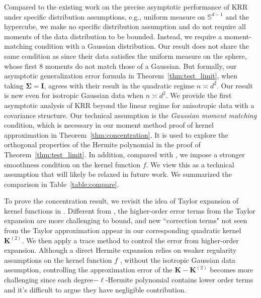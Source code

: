 \documentclass[twoside,11pt]{article}
\def\bI{{\mathbf I}}
\def\bK{{\boldsymbol K}}
\def\bSigma{{\boldsymbol \Sigma}}
\renewcommand{\bK}{\boldsymbol{K}}
\newcommand{\1}{\mathbf{1}}
\begin{document}
Compared to the existing work \citep{mei2019generalization,xiao2022precise,montanari2020interpolation,mei2021generalization} on the precise asymptotic performance of KRR under specific distribution assumptions, e.g., uniform measure on $\mathbb{S}^{d-1}$ and the hypercube, we make no specific distribution assumption and do not require all moments of the data distribution to be bounded. Instead, we require a moment-matching condition with a Gaussian distribution. Our result does not share the same condition as \cite{xiao2022precise} since their data satisfies the uniform measure on the sphere, whose first 8 moments do not match those of a Gaussian. But formally, our asymptotic generalization error formula in Theorem~\ref{thm:test_limit}, when taking $\bSigma=\bI$, agrees with their result in the quadratic regime $n\asymp d^2$.  Our result is new even for isotropic Gaussian data when $n\asymp d^2$. We provide the first asymptotic analysis of KRR beyond the linear regime for anisotropic data with a covariance structure. Our technical assumption is the \textit{Gaussian moment matching} condition, which is necessary in our moment method proof of kernel approximation in Theorem~\ref{thm:concentration}. It is used to explore the orthogonal properties of the Hermite polynomial in the proof of Theorem~\ref{thm:test_limit}. In addition, compared with \cite{xiao2022precise,ghorbani2021linearized,mei2021generalization}, we impose a stronger smoothness condition on the kernel function $f$. We view this as a technical assumption that will likely be relaxed in future work. We summarized the comparison in Table~\ref{table:compare}.



To prove the concentration result,  we revisit the idea of Taylor expansion of kernel functions in \citep{el2010spectrum}. Different from \cite{el2010spectrum}, the higher-order error terms from the Taylor expansion are more challenging to bound, and new ``correction terms" not seen from the Taylor approximation appear in our corresponding quadratic kernel $\bK^{(2)}$. 
We then apply a trace method to control the error from higher-order expansion. 
Although a direct Hermite expansion relies on weaker regularity assumptions on the kernel function $f$ \citep{mei2021generalization}, without the isotropic Gaussian data assumption, controlling the approximation error of the $\mathbf{K}-\mathbf{K}^{(2)}$ becomes more challenging since each degree$-\ell$-Hermite polynomial contains lower order terms and it's difficult to argue they have negligible contribution.
\end{document}
